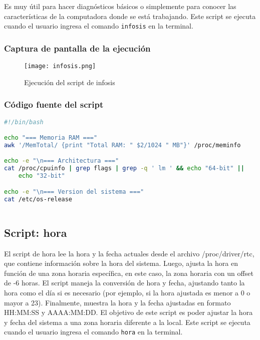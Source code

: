 \documentclass{article}
\begin{document}
Es muy útil para hacer diagnósticos básicos o simplemente para conocer las características de la computadora donde se está trabajando.
Este script se ejecuta cuando el usuario ingresa el comando \texttt{infosis} en la terminal.

\subsubsection{Captura de pantalla de la ejecución}

\begin{figure}[h!]
\centering
\texttt{[image: infosis.png]}
\caption{Ejecución del script de infosis}
\end{figure}

\subsubsection{Código fuente del script}

\begin{lstlisting}[language=bash]
#!/bin/bash

echo "=== Memoria RAM ==="
awk '/MemTotal/ {print "Total RAM: " $2/1024 " MB"}' /proc/meminfo

echo -e "\n=== Architectura ==="
cat /proc/cpuinfo | grep flags | grep -q ' lm ' && echo "64-bit" ||
    echo "32-bit"

echo -e "\n=== Version del sistema ==="
cat /etc/os-release
                                                 
\end{lstlisting}
\pagebreak
\subsection{Script: hora}

El script de hora lee la hora y la fecha actuales desde el archivo /proc/driver/rtc, que contiene información sobre la hora del sistema. Luego, ajusta la hora en función de una zona horaria específica, en este caso, la zona horaria con un offset de -6 horas. El script maneja la conversión de hora y fecha, ajustando tanto la hora como el día si es necesario (por ejemplo, si la hora ajustada es menor a 0 o mayor a 23). Finalmente, muestra la hora y la fecha ajustadas en formato HH:MM:SS y AAAA:MM:DD.  El objetivo de este script es poder ajustar la hora y fecha del sistema a una zona horaria diferente a la local. 
Este script se ejecuta cuando el usuario ingresa el comando \texttt{hora} en la terminal.
\end{document}
